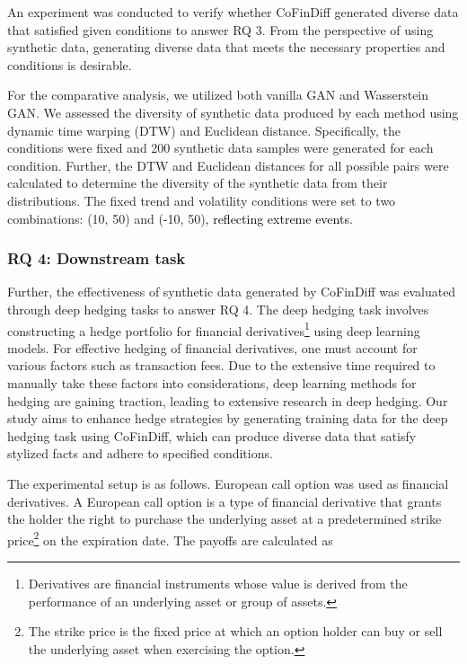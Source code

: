 \documentclass{article}
\newcommand{\hashimoto}[1]{\textcolor{black}{#1}}
\begin{document}
An experiment was conducted to verify whether CoFinDiff generated diverse data that satisfied given conditions to answer RQ 3.
From the perspective of using synthetic data, generating diverse data that meets the necessary properties and conditions is desirable.

For the comparative analysis, we utilized both vanilla GAN and Wasserstein GAN.
We assessed the diversity of synthetic data produced by each method using dynamic time warping (DTW) and Euclidean distance.
Specifically, the conditions were fixed and 200 synthetic data samples were generated for each condition.
Further, the DTW and Euclidean distances for all possible pairs were calculated to determine the diversity of the synthetic data from their distributions.
The fixed trend and volatility conditions were set to two combinations: (10, 50) and (-10, 50)\hashimoto{, reflecting extreme events}.

\subsubsection{RQ 4: Downstream task}

Further, the effectiveness of synthetic data generated by CoFinDiff was evaluated through deep hedging tasks to answer RQ 4. 
The deep hedging task involves constructing a hedge portfolio for financial derivatives\footnote{Derivatives are financial instruments whose value is derived from the performance of an underlying asset or group of assets.} using deep learning models.
For effective hedging of financial derivatives, one must account for various factors such as transaction fees. 
Due to the extensive time required to manually take these factors into considerations, deep learning methods for hedging are gaining traction, leading to extensive research in deep hedging.
Our study aims to enhance hedge strategies by generating training data for the deep hedging task using CoFinDiff, which can produce diverse data that satisfy stylized facts and adhere to specified conditions.

The experimental setup is as follows. European call option was used as financial derivatives. A European call option is a type of financial derivative that grants the holder the right to purchase the underlying asset at a predetermined strike price\footnote{The strike price is the fixed price at which an option holder can buy or sell the underlying asset when exercising the option.} on the expiration date. The payoffs are calculated as
\end{document}
